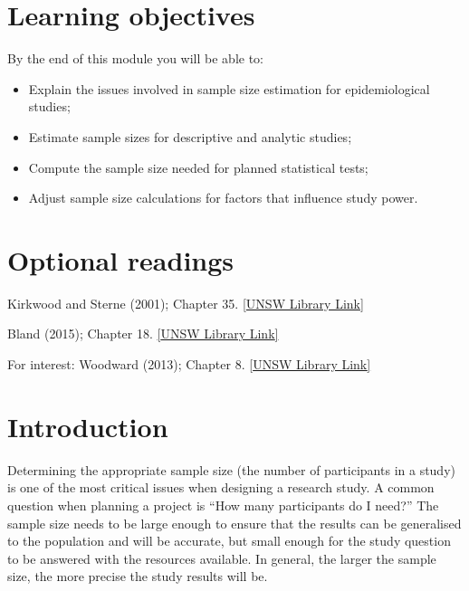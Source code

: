 \documentclass[
  a4paper,
]{memoir}
\providecommand{\tightlist}{%
  \setlength{\itemsep}{0pt}\setlength{\parskip}{0pt}}
\begin{document}
\section*{Learning objectives}\label{learning-objectives-9}


By the end of this module you will be able to:

\begin{itemize}
\tightlist
\item
  Explain the issues involved in sample size estimation for
  epidemiological studies;
\item
  Estimate sample sizes for descriptive and analytic studies;
\item
  Compute the sample size needed for planned statistical tests;
\item
  Adjust sample size calculations for factors that influence study
  power.
\end{itemize}

\section*{Optional readings}\label{optional-readings-9}


Kirkwood and Sterne (2001); Chapter 35.
\href{http://er1.library.unsw.edu.au/er/cgi-bin/eraccess.cgi?url=https://ebookcentral.proquest.com/lib/unsw/detail.action?docID=624728}{{[}UNSW
Library Link{]}}

Bland (2015); Chapter 18.
\href{http://er1.library.unsw.edu.au/er/cgi-bin/eraccess.cgi?url=https://ebookcentral.proquest.com/lib/unsw/detail.action?docID=5891730}{{[}UNSW
Library Link{]}}

For interest: Woodward (2013); Chapter 8.
\href{http://er1.library.unsw.edu.au/er/cgi-bin/eraccess.cgi?url=https://ebookcentral.proquest.com/lib/unsw/detail.action?docID=1575748}{{[}UNSW
Library Link{]}}

\section{Introduction}\label{introduction-9}

Determining the appropriate sample size (the number of participants in a
study) is one of the most critical issues when designing a research
study. A common question when planning a project is ``How many
participants do I need?'' The sample size needs to be large enough to
ensure that the results can be generalised to the population and will be
accurate, but small enough for the study question to be answered with
the resources available. In general, the larger the sample size, the
more precise the study results will be.
\end{document}
